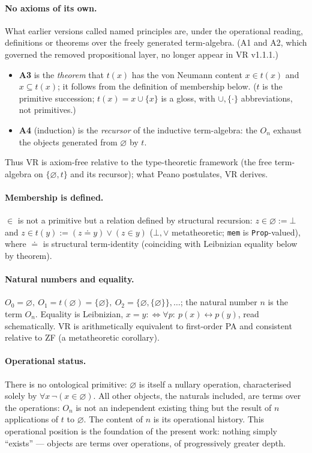 \documentclass[11pt]{article}
\theoremstyle{definition}
\newcommand{\zero}{\varnothing}
\newcommand{\Obj}{O}
\begin{document}
\paragraph{No axioms of its own.} What earlier versions called named principles are, under
the operational reading, definitions or theorems over the freely generated term-algebra. (A1 and A2,
which governed the removed propositional layer, no longer appear in VR v1.1.1.)
\begin{itemize}
\item \textbf{A3} is the \emph{theorem} that $t(x)$ has the von Neumann content
$x\in t(x)$ and $x\subseteq t(x)$; it follows from the definition of membership below. ($t$ is the
primitive succession; $t(x)=x\cup\{x\}$ is a gloss, with $\cup,\{\cdot\}$ abbreviations, not primitives.)
\item \textbf{A4} (induction) is the \emph{recursor} of the inductive term-algebra: the $\Obj_n$
exhaust the objects generated from $\zero$ by $t$.
\end{itemize}
Thus VR is axiom-free relative to the type-theoretic framework (the free term-algebra on
$\{\zero,t\}$ and its recursor); what Peano postulates, VR derives.

\paragraph{Membership is defined.} $\in$ is not a primitive but a relation defined by structural
recursion: $z\in\zero := \bot$ and $z\in t(y) := (z\doteq y)\vee(z\in y)$ ($\bot,\vee$ metatheoretic; \texttt{mem} is \texttt{Prop}-valued), where $\doteq$ is structural
term-identity (coinciding with Leibnizian equality below by theorem).

\paragraph{Natural numbers and equality.} $\Obj_0=\zero,\ \Obj_1=t(\zero)=\{\zero\},\
\Obj_2=\{\zero,\{\zero\}\},\dots$; the natural number $n$ is the term $\Obj_n$. Equality is
Leibnizian, $x=y :\Leftrightarrow \forall p:\ p(x)\leftrightarrow p(y)$, read schematically. VR is
arithmetically equivalent to first-order PA and consistent relative to ZF (a metatheoretic corollary).

\paragraph{Operational status.} There is no ontological primitive: $\zero$ is itself a nullary
operation, characterised solely by $\forall x\,\neg(x\in\zero)$. All other objects, the naturals
included, are terms over the operations: $\Obj_n$ is not an independent existing thing but the result
of $n$ applications of $t$ to $\zero$. The content of $n$ is its operational history. This operational
position is the foundation of the present work: nothing simply ``exists'' --- objects are terms over
operations, of progressively greater depth.
\end{document}
